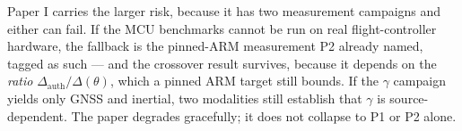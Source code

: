 \documentclass[11pt,a4paper]{article}
\begin{document}
\begin{honestly}
Paper I carries the larger risk, because it has two measurement campaigns and
either can fail. If the MCU benchmarks cannot be run on real flight-controller
hardware, the fallback is the pinned-ARM measurement P2 already named, tagged as
such --- and the crossover result survives, because it depends on the
\emph{ratio} $\Delta_{\mathrm{auth}}/\Delta(\theta)$, which a pinned ARM target
still bounds. If the $\gamma$ campaign yields only GNSS and inertial, two
modalities still establish that $\gamma$ is source-dependent. The paper degrades
gracefully; it does not collapse to P1 or P2 alone.
\end{honestly}

\small


\end{document}
